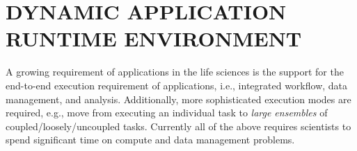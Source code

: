 \documentclass{sig-alternate}
\begin{document}



\section{DYNAMIC APPLICATION RUNTIME ENVIRONMENT}

A growing requirement of applications in the life sciences is the
support for the end-to-end execution requirement of applications,
i.e., integrated workflow, data management, and analysis.
Additionally, more sophisticated execution modes are required, e.g.,
move from executing an individual task to \textit{large ensembles} of
coupled/loosely/uncoupled tasks.  Currently all of the above requires
scientists to spend significant time on compute and data management
problems.
\end{document}
